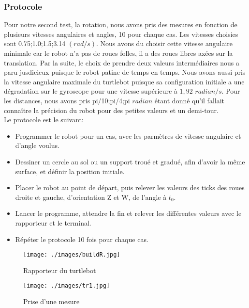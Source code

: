 \documentclass[10pt,a4paper]{article}
\begin{document}
\subsubsection{Protocole}
Pour notre second test, la rotation, nous avons pris des mesures en fonction de plusieurs vitesses angulaires et angles, 10 pour chaque cas.
Les vitesses choisies sont {0.75;1.0;1.5;3.14} $(rad/s)$. Nous avons  du choisir cette vitesse angulaire minimale car le robot n'a pas de roues folles, il a des roues libres axées sur la translation. Par la suite, le choix de prendre deux valeurs intermédiaires nous a paru jusdicieux puisque le robot patine de temps en temps. Nous avons aussi pris la vitesse angulaire maximale du turtlebot puisque sa configuration initiale a une dégradation sur le gyroscope pour une vitesse supérieure à $1,92$ $radian/s$. Pour les distances, nous avons pris {pi/10;pi/4;pi} $radian$ étant donné qu'il fallait connaître la précision du robot pour des petites valeurs et un demi-tour.\\
Le protocole est le suivant:\\
\begin{itemize}
\item Programmer le robot pour un cas, avec les parmètres de vitesse angulaire et d'angle voulus.\\
\item Dessiner un cercle au sol ou un support troué et gradué, afin d'avoir la même surface, et définir la position initiale.\\
\item Placer le robot au point de départ, puis relever les valeurs des ticks des roues droite et gauche, d'orientation Z et W, de l'angle à $t_0$.\\
\item Lancer le programme, attendre la fin et relever les différentes valeurs avec le rapporteur et le terminal.\\
\item Répéter le protocole 10 fois pour chaque cas.\\
\end{itemize}
\vspace{5mm}

\begin{figure}[!h]
    \begin{minipage}[c]{.46\linewidth}
        \centering
        \texttt{[image: ./images/buildR.jpg]}\tiny
        \caption{Rapporteur du turtlebot}
    \end{minipage}
    \hfill%
    \begin{minipage}[c]{.46\linewidth}
        \centering
        \texttt{[image: ./images/tr1.jpg]}
        \caption{Prise d'une mesure}
    \end{minipage}
\end{figure}
\vspace{5mm}
\end{document}
